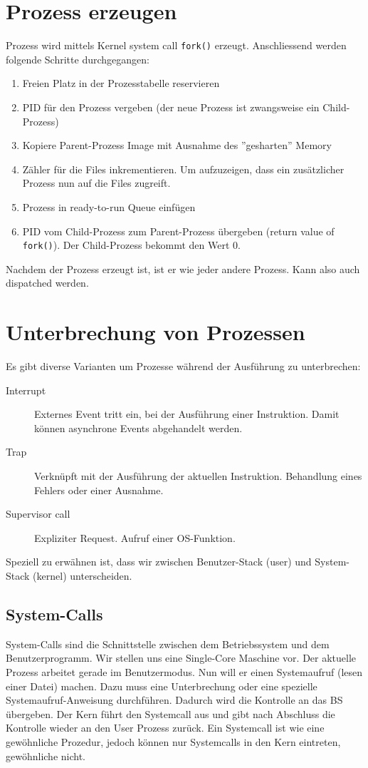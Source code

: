 \section{Prozess erzeugen}
Prozess wird mittels Kernel system call \texttt{fork()} erzeugt. Anschliessend werden folgende Schritte durchgegangen:
\begin{enumerate}
	\item Freien Platz in der Prozesstabelle reservieren
	\item PID für den Prozess vergeben (der neue Prozess ist zwangsweise ein Child-Prozess)
	\item Kopiere Parent-Prozess Image mit Ausnahme des ''gesharten'' Memory
	\item Zähler für die Files inkrementieren. Um aufzuzeigen, dass ein zusätzlicher Prozess nun auf die Files zugreift.
	\item Prozess in ready-to-run Queue einfügen
	\item PID vom Child-Prozess zum Parent-Prozess übergeben (return value of \texttt{fork()}). Der Child-Prozess bekommt den Wert 0.
\end{enumerate}
Nachdem der Prozess erzeugt ist, ist er wie jeder andere Prozess. Kann also auch dispatched werden.

\section{Unterbrechung von Prozessen}
Es gibt diverse Varianten um Prozesse während der Ausführung zu unterbrechen:
\begin{description}
	\item[Interrupt] Externes Event tritt ein, bei der Ausführung einer Instruktion. Damit können asynchrone Events abgehandelt werden.
	\item[Trap] Verknüpft mit der Ausführung der aktuellen Instruktion. Behandlung eines Fehlers oder einer Ausnahme.
	\item[Supervisor call] Expliziter Request. Aufruf einer OS-Funktion.
\end{description}
Speziell zu erwähnen ist, dass wir zwischen Benutzer-Stack (user) und System-Stack (kernel) unterscheiden.

\subsection{System-Calls}
System-Calls sind die Schnittstelle zwischen dem Betriebssystem und dem Benutzerprogramm. Wir stellen uns eine Single-Core Maschine vor. Der aktuelle Prozess arbeitet gerade im Benutzermodus. Nun will er einen Systemaufruf (lesen einer Datei) machen. Dazu muss eine Unterbrechung oder eine spezielle Systemaufruf-Anweisung durchführen. Dadurch wird die Kontrolle an das BS übergeben. Der Kern führt den Systemcall aus und gibt nach Abschluss die Kontrolle wieder an den User Prozess zurück. Ein Systemcall ist wie eine gewöhnliche Prozedur, jedoch können nur Systemcalls in den Kern eintreten, gewöhnliche nicht.

